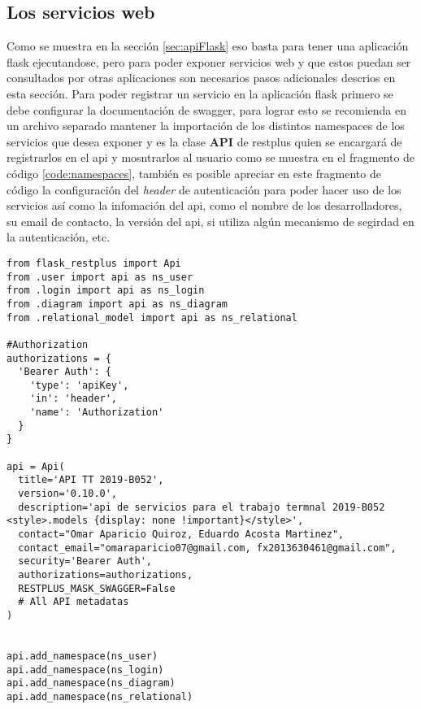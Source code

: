 \subsection{Los servicios web}

Como se muestra en la sección \ref{sec:apiFlask} eso basta para tener una aplicación flask ejecutandose, pero para poder exponer servicios web y que estos puedan ser consultados por otras aplicaciones son necesarios pasos adicionales descrios en esta sección. Para poder registrar un servicio en la aplicación flask primero se debe configurar la documentación de swagger, para lograr esto se recomienda en un archivo separado mantener la importación de los distintos namespaces de los servicios que desea exponer y es la clase \textbf{API} de restplus quien se encargará de registrarlos en el api y mosntrarlos al usuario como se muestra en el fragmento de código \ref{code:namespaces}, también es posible apreciar en este fragmento de código la configuración del \textit{header} de autenticación para poder hacer uso de los servicios así como la infomación del api, como el nombre de los desarrolladores, su email de contacto, la versión del api, si utiliza algún mecanismo de segirdad en la autenticación, etc.

\begin{code}
\label{code:namespaces}
\begin{verbatim}
from flask_restplus import Api
from .user import api as ns_user
from .login import api as ns_login
from .diagram import api as ns_diagram
from .relational_model import api as ns_relational

#Authorization
authorizations = {
  'Bearer Auth': {
    'type': 'apiKey',
    'in': 'header',
    'name': 'Authorization'
  }
}

api = Api(
  title='API TT 2019-B052',
  version='0.10.0',
  description='api de servicios para el trabajo termnal 2019-B052 <style>.models {display: none !important}</style>',
  contact="Omar Aparicio Quiroz, Eduardo Acosta Martinez",
  contact_email="omaraparicio07@gmail.com, fx2013630461@gmail.com",
  security='Bearer Auth',
  authorizations=authorizations,
  RESTPLUS_MASK_SWAGGER=False
  # All API metadatas
)


api.add_namespace(ns_user)
api.add_namespace(ns_login)
api.add_namespace(ns_diagram)
api.add_namespace(ns_relational)
\end{verbatim}
\end{code}

